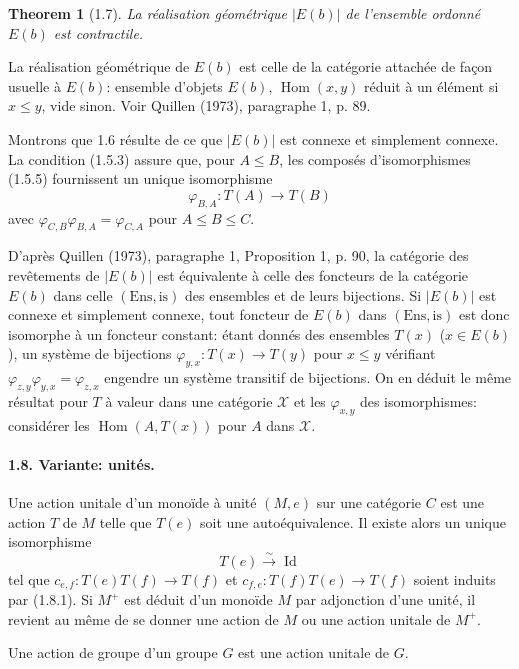 \documentclass[11pt]{article}
\newcommand{\Id}{\operatorname{Id}}
\newcommand{\Hom}{\operatorname{Hom}}
\newcommand{\calX}{\mathcal X}
\newtheorem{theorem}{Theorem}[section]
\begin{document}
\begin{theorem}[1.7]
La réalisation géométrique $|E(b)|$ de l'ensemble ordonné $E(b)$ est contractile.
\end{theorem}
La réalisation géométrique de $E(b)$ est celle de la catégorie attachée de façon usuelle à $E(b)$: ensemble d'objets $E(b)$, $\Hom(x,y)$ réduit à un élément si $x\leq y$, vide sinon. Voir Quillen (1973), paragraphe 1, p. 89.

Montrons que 1.6 résulte de ce que $|E(b)|$ est connexe et simplement connexe. La condition (1.5.3) assure que, pour $A\leq B$, les composés d'isomorphismes (1.5.5) fournissent un unique isomorphisme
\[
 \varphi_{B,A}:T(A)\longrightarrow T(B)
\]
avec $\varphi_{C,B}\varphi_{B,A}=\varphi_{C,A}$ pour $A\leq B\leq C$.

D'après Quillen (1973), paragraphe 1, Proposition 1, p. 90, la catégorie des revêtements de $|E(b)|$ est équivalente à celle des foncteurs de la catégorie $E(b)$ dans celle $(\mathrm{Ens},\mathrm{is})$ des ensembles et de leurs bijections. Si $|E(b)|$ est connexe et simplement connexe, tout foncteur de $E(b)$ dans $(\mathrm{Ens},\mathrm{is})$ est donc isomorphe à un foncteur constant: étant donnés des ensembles $T(x)$ ($x\in E(b)$), un système de bijections $\varphi_{y,x}:T(x)\to T(y)$ pour $x\leq y$ vérifiant $\varphi_{z,y}\varphi_{y,x}=\varphi_{z,x}$ engendre un système transitif de bijections. On en déduit le même résultat pour $T$ à valeur dans une catégorie $\calX$ et les $\varphi_{x,y}$ des isomorphismes: considérer les $\Hom(A,T(x))$ pour $A$ dans $\calX$.

\paragraph{1.8. Variante: unités.} Une action unitale d'un monoïde à unité $(M,e)$ sur une catégorie $C$ est une action $T$ de $M$ telle que $T(e)$ soit une autoéquivalence. Il existe alors un unique isomorphisme
\begin{equation}
 T(e)\xrightarrow{\sim}\Id
\tag{1.8.1}
\end{equation}
tel que $c_{e,f}:T(e)T(f)\to T(f)$ et $c_{f,e}:T(f)T(e)\to T(f)$ soient induits par (1.8.1). Si $M^+$ est déduit d'un monoïde $M$ par adjonction d'une unité, il revient au même de se donner une action de $M$ ou une action unitale de $M^+$.

Une action de groupe d'un groupe $G$ est une action unitale de $G$.
\end{document}
